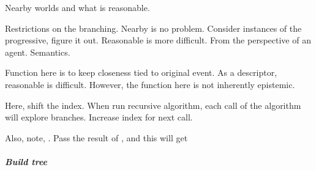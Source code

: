 \begin{note}[Reasonable]
  Nearby worlds and what is reasonable.

  Restrictions on the branching.
  Nearby is no problem.
  Consider instances of the progressive, figure it out.
  Reasonable is more difficult.
  From the perspective of an agent.
  Semantics.

  Function here is to keep closeness tied to original event.
  As a descriptor, reasonable is difficult.
  However, the function here is not inherently epistemic.
\end{note}

\begin{note}
  Here, shift the index.
  When run recursive algorithm, each call of the algorithm will explore branches.
  Increase index for next call.

  Also, note, \AlgGetPStops{}.
  Pass the result of \AlgGetPStops{}, and this will get 
\end{note}

\subparagraph{Build tree}

